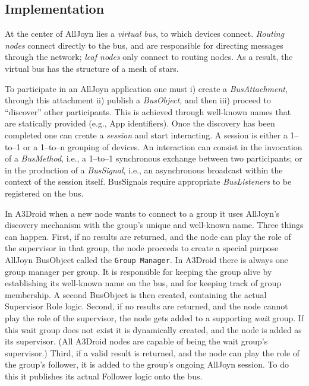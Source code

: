 \subsection{Implementation}
\label{subg:a3droidNodes}

At the center of AllJoyn lies a \emph{virtual bus}, to which devices connect. \emph{Routing nodes} connect directly to the bus, and are responsible for directing messages through the network; \emph{leaf nodes} only connect to routing nodes. As a result, the virtual bus has the structure of a mesh of stars. 

To participate in an AllJoyn application one must i) create a \emph{BusAttachment}, through this attachment ii) publish a \emph{BusObject}, and then iii) proceed to ``discover'' other participants. This is achieved through well-known names that are statically provided (e.g., App identifiers). Once the discovery has been completed one can create a \emph{session} and start interacting. A session is either a 1--to--1 or a 1--to--n grouping of devices. An interaction can consist in the invocation of a \emph{BusMethod}, i.e., a 1--to--1 synchronous exchange between two participants; or in the production of a \emph{BusSignal}, i.e., an asynchronous broadcast within the context of the session itself. BusSignals require appropriate \emph{BusListeners} to be registered on the bus.

In A3Droid when a new node wants to connect to a group it uses AllJoyn's discovery mechanism with the group's unique and well-known name. Three things can happen. First, if no results are returned, and the node can play the role of the supervisor in that group, the node proceeds to create a special purpose AllJoyn BusObject called the \texttt{Group Manager}. In A3Droid there is always one group manager per group. It is responsible for keeping the group alive by establishing its well-known name on the bus, and for keeping track of group membership. A second BusObject is then created, containing the actual Supervisor Role logic. Second, if no results are returned, and the node cannot play the role of the supervisor, the node gets added to a supporting \emph{wait} group. If this wait group does not exist it is dynamically created, and the node is added as its supervisor. (All A3Droid nodes are capable of being the wait group's supervisor.) Third, if a valid result is returned, and the node can play the role of the group's follower, it is added to the group's ongoing AllJoyn session. To do this it publishes its actual Follower logic onto the bus. 

